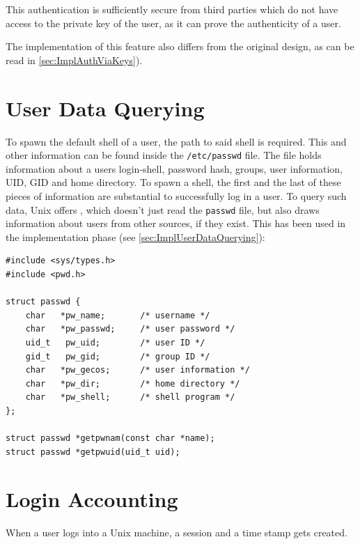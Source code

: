 \documentclass[10pt,a4paper,titlepage,twoside,english,final]{zhawreprt}
\begin{document}
This authentication is sufficiently secure from third parties which do not have access to the private key of the user, as it can prove the authenticity of a user.

The implementation of this feature also differs from the original design, as can be read in \ref{sec:ImplAuthViaKeys}).

\section{User Data Querying}\label{sec:DesignUserDataQuerying}
To spawn the default \gls{shell} of a user, the path to said \gls{shell} is required.
This and other information can be found inside the \texttt{/etc/passwd} file.
The file holds information about a users \gls{login}-\gls{shell}, password hash, groups, user information, \gls{UID}, \gls{GID} and home directory.
To spawn a \gls{shell}, the first and the last of these pieces of information are substantial to successfully log in a user.
To query such data, \gls{Unix} offers \cite{getpw}, which doesn't just read the \texttt{passwd} file, but also draws information about users from other sources, if they exist.
This has been used in the implementation phase (see \ref{sec:ImplUserDataQuerying}):
\setlistingC
\begin{lstlisting}[caption={Definition of passwd and {\cite{getpw}}},label=lst:PasswdDefinition]
#include <sys/types.h>
#include <pwd.h>

struct passwd {
	char   *pw_name;       /* username */
	char   *pw_passwd;     /* user password */
	uid_t   pw_uid;        /* user ID */
	gid_t   pw_gid;        /* group ID */
	char   *pw_gecos;      /* user information */
	char   *pw_dir;        /* home directory */
	char   *pw_shell;      /* shell program */
};

struct passwd *getpwnam(const char *name);
struct passwd *getpwuid(uid_t uid);
\end{lstlisting}

\section{Login Accounting}\label{sec:DesignLoginAccounting}
When a user logs into a \gls{Unix} machine, a session and a time stamp gets created.
\end{document}
